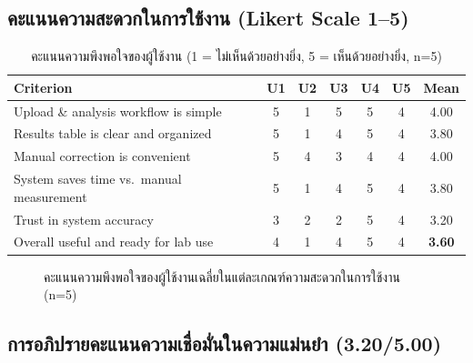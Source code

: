 \subsection{คะแนนความสะดวกในการใช้งาน (Likert Scale 1--5)}

\begin{table}[H]
  \centering
  \caption{คะแนนความพึงพอใจของผู้ใช้งาน (1 = ไม่เห็นด้วยอย่างยิ่ง, 5 = เห็นด้วยอย่างยิ่ง, n=5)}
  \label{tab:usability}
  \begin{tabular}{lcccccc}
    \toprule
    \textbf{Criterion} & \textbf{U1} & \textbf{U2} & \textbf{U3} & \textbf{U4} & \textbf{U5} & \textbf{Mean} \\
    \midrule
    Upload \& analysis workflow is simple     & 5 & 1 & 5 & 5 & 4 & 4.00 \\
    Results table is clear and organized      & 5 & 1 & 4 & 5 & 4 & 3.80 \\
    Manual correction is convenient           & 5 & 4 & 3 & 4 & 4 & 4.00 \\
    System saves time vs.\ manual measurement & 5 & 1 & 4 & 5 & 4 & 3.80 \\
    Trust in system accuracy                  & 3 & 2 & 2 & 5 & 4 & 3.20 \\
    Overall useful and ready for lab use      & 4 & 1 & 4 & 5 & 4 & \textbf{3.60} \\
    \bottomrule
  \end{tabular}
\end{table}

\begin{figure}[H]
  \centering
  \caption{คะแนนความพึงพอใจของผู้ใช้งานเฉลี่ยในแต่ละเกณฑ์ความสะดวกในการใช้งาน (n=5)}
  \label{fig:usability_bar}
\end{figure}

\subsection{การอภิปรายคะแนนความเชื่อมั่นในความแม่นยำ (3.20/5.00)}


